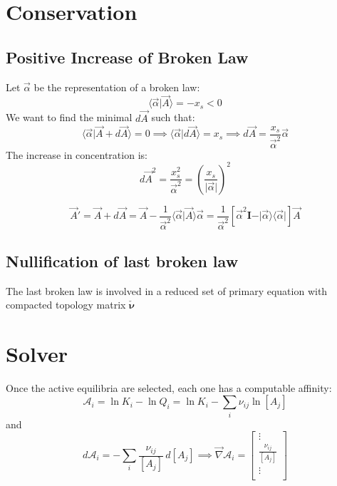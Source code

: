 \documentclass[aps,12pt]{revtex4}
\begin{document}
\section{Conservation}

\subsection{Positive Increase of Broken Law}
Let $\vec \alpha$ be the representation of a broken law:
\begin{equation}
	\langle \vec \alpha \vert \vec A \rangle = - x_s < 0
\end{equation}
We want to find the minimal $d \vec A$ such that:
\begin{equation}
	\langle \vec \alpha \vert \vec A + d\vec A \rangle = 0 \implies \langle \vec \alpha \vert d \vec A \rangle = x_s \implies d \vec A = \dfrac{x_s}{\vec\alpha^2} \vec \alpha
\end{equation}
The increase in concentration is:
\begin{equation}
	d \vec A^2 = \dfrac{x_s^2}{\vec \alpha^2} = \left( \dfrac{x_s}{\vert\vec\alpha\vert}\right) ^2
\end{equation}

\begin{equation}
	\vec A ' = \vec A + d \vec A = \vec{A} - \dfrac{1}{\vec \alpha^2} \langle \vec \alpha \vert \vec A \rangle \vec \alpha 
	= \dfrac{1}{\vec \alpha^2} \left[ \vec \alpha^2 \bm I - \vert \vec \alpha \rangle \langle \vec \alpha \vert \right] \vec A
\end{equation}

\subsection{Nullification of last broken law}
The last broken law is involved in a reduced set of primary equation with
compacted topology matrix $\check {\bm \nu}$
 		
\section{Solver}

Once the active equilibria are selected, each one has a computable 
affinity:
\begin{equation}
\label{eq:affinity}
	\mathcal A_i = \ln K_i - \ln Q_i = \ln K_i -  \sum_{i} \nu_{ij} \ln [A_j] %
\end{equation}
and
\begin{equation}
	d \mathcal A_i = - \sum_i \dfrac{\nu_{ij}}{[A_j]} \, d[A_j] \implies
	 \vec \nabla \mathcal A_i = 
	\begin{bmatrix}
	\vdots\\
	\frac{\nu_{ij}}{[A_j]}\\
	\vdots\\
	\end{bmatrix}
\end{equation}
\end{document}
